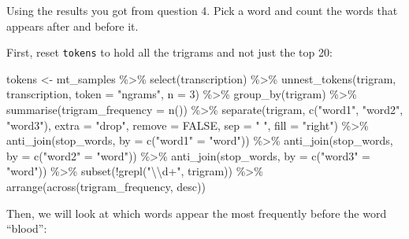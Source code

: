 \documentclass[
]{article}
\newenvironment{Shaded}{\begin{snugshade}}{\end{snugshade}}
\newcommand{\AttributeTok}[1]{\textcolor[rgb]{0.77,0.63,0.00}{#1}}
\newcommand{\ConstantTok}[1]{\textcolor[rgb]{0.00,0.00,0.00}{#1}}
\newcommand{\DecValTok}[1]{\textcolor[rgb]{0.00,0.00,0.81}{#1}}
\newcommand{\FunctionTok}[1]{\textcolor[rgb]{0.00,0.00,0.00}{#1}}
\newcommand{\NormalTok}[1]{#1}
\newcommand{\OtherTok}[1]{\textcolor[rgb]{0.56,0.35,0.01}{#1}}
\newcommand{\SpecialCharTok}[1]{\textcolor[rgb]{0.00,0.00,0.00}{#1}}
\newcommand{\StringTok}[1]{\textcolor[rgb]{0.31,0.60,0.02}{#1}}
\begin{document}
Using the results you got from question 4. Pick a word and count the
words that appears after and before it.

First, reset \texttt{tokens} to hold all the trigrams and not just the
top 20:

\begin{Shaded}
\begin{Highlighting}[]
\NormalTok{tokens }\OtherTok{\textless{}{-}}\NormalTok{ mt\_samples }\SpecialCharTok{\%\textgreater{}\%}
  \FunctionTok{select}\NormalTok{(transcription) }\SpecialCharTok{\%\textgreater{}\%}
  \FunctionTok{unnest\_tokens}\NormalTok{(trigram, transcription, }\AttributeTok{token =} \StringTok{"ngrams"}\NormalTok{, }\AttributeTok{n =} \DecValTok{3}\NormalTok{) }\SpecialCharTok{\%\textgreater{}\%}
  \FunctionTok{group\_by}\NormalTok{(trigram) }\SpecialCharTok{\%\textgreater{}\%}
  \FunctionTok{summarise}\NormalTok{(}\AttributeTok{trigram\_frequency =} \FunctionTok{n}\NormalTok{()) }\SpecialCharTok{\%\textgreater{}\%}
  \FunctionTok{separate}\NormalTok{(trigram, }
           \FunctionTok{c}\NormalTok{(}\StringTok{"word1"}\NormalTok{, }\StringTok{"word2"}\NormalTok{, }\StringTok{"word3"}\NormalTok{), }
           \AttributeTok{extra =} \StringTok{"drop"}\NormalTok{, }
           \AttributeTok{remove =} \ConstantTok{FALSE}\NormalTok{, }
           \AttributeTok{sep =} \StringTok{" "}\NormalTok{, }
           \AttributeTok{fill =} \StringTok{"right"}\NormalTok{) }\SpecialCharTok{\%\textgreater{}\%}
  \FunctionTok{anti\_join}\NormalTok{(stop\_words, }\AttributeTok{by =} \FunctionTok{c}\NormalTok{(}\StringTok{"word1"} \OtherTok{=} \StringTok{"word"}\NormalTok{)) }\SpecialCharTok{\%\textgreater{}\%}
  \FunctionTok{anti\_join}\NormalTok{(stop\_words, }\AttributeTok{by =} \FunctionTok{c}\NormalTok{(}\StringTok{"word2"} \OtherTok{=} \StringTok{"word"}\NormalTok{)) }\SpecialCharTok{\%\textgreater{}\%}
  \FunctionTok{anti\_join}\NormalTok{(stop\_words, }\AttributeTok{by =} \FunctionTok{c}\NormalTok{(}\StringTok{"word3"} \OtherTok{=} \StringTok{"word"}\NormalTok{)) }\SpecialCharTok{\%\textgreater{}\%}
  \FunctionTok{subset}\NormalTok{(}\SpecialCharTok{!}\FunctionTok{grepl}\NormalTok{(}\StringTok{"}\SpecialCharTok{\textbackslash{}\textbackslash{}}\StringTok{d+"}\NormalTok{, trigram)) }\SpecialCharTok{\%\textgreater{}\%}
  \FunctionTok{arrange}\NormalTok{(}\FunctionTok{across}\NormalTok{(trigram\_frequency, desc))}
\end{Highlighting}
\end{Shaded}

Then, we will look at which words appear the most frequently before the
word ``blood'':
\end{document}
